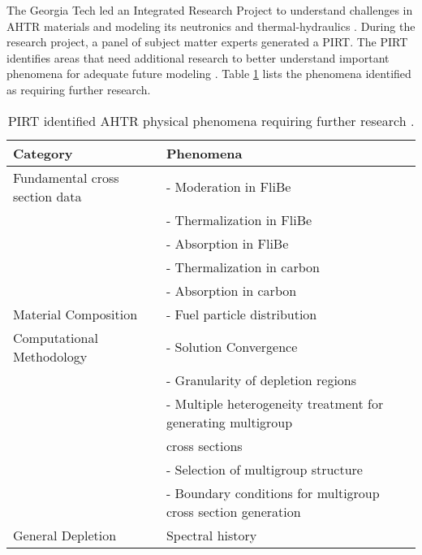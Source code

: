 The \gls{Georgia Tech} led an Integrated Research Project to 
understand challenges in \gls{AHTR} materials and modeling its neutronics and 
thermal-hydraulics \cite{zhang_integrated_2019}. 
During the research project, a panel of subject matter experts 
generated a \gls{PIRT}.
The \gls{PIRT} identifies areas that need additional research to better 
understand important phenomena for adequate future modeling
\cite{rahnema_phenomena_2019}. 
Table \ref{tab:phenomena} lists the phenomena identified as requiring further 
research. 

\begin{table}[]
    \centering
    \onehalfspacing
    \caption{\acrlong{PIRT} identified \acrlong{AHTR} physical phenomena requiring 
    further research \cite{rahnema_phenomena_2019}.}
	\label{tab:phenomena}
    \footnotesize
    \begin{tabular}{l|l}
    \hline
    \textbf{Category} & \textbf{Phenomena} \\ \hline
    Fundamental cross section data & - Moderation in FliBe \\
    & - Thermalization in FliBe \\
    & - Absorption in FliBe \\
    & - Thermalization in carbon \\
    & - Absorption in carbon \\ \hline
    Material Composition & - Fuel particle distribution \\ \hline
    Computational Methodology & - Solution Convergence \\ 
    & - Granularity of depletion regions \\
    & - Multiple heterogeneity treatment for generating multigroup \\ 
    & cross sections \\
    & - Selection of multigroup structure \\
    & - Boundary conditions for multigroup cross section generation \\ \hline 
    General Depletion & Spectral history \\ \hline 
    \end{tabular}
    \end{table}

